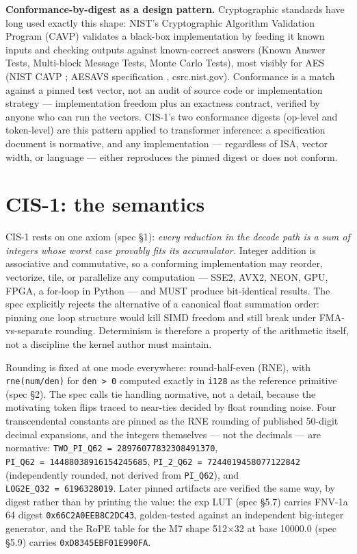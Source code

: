 \documentclass[11pt]{article}
\begin{document}
\textbf{Conformance-by-digest as a design pattern.} Cryptographic standards
have long used exactly this shape: NIST's Cryptographic Algorithm
Validation Program (CAVP) validates a black-box implementation by feeding
it known inputs and checking outputs against known-correct answers (Known
Answer Tests, Multi-block Message Tests, Monte Carlo Tests), most visibly
for AES (NIST CAVP \citep{nistcavp}; AESAVS specification \citep{nistaesavs}, csrc.nist.gov). Conformance is a
match against a pinned test vector, not an audit of source code or
implementation strategy --- implementation freedom plus an exactness
contract, verified by anyone who can run the vectors. CIS-1's two
conformance digests (op-level and token-level) are this pattern applied to
transformer inference: a specification document is normative, and any
implementation --- regardless of ISA, vector width, or language --- either
reproduces the pinned digest or does not conform.

\section{CIS-1: the semantics}\label{cis-1-the-semantics}

CIS-1 rests on one axiom (spec §1): \emph{every reduction in the decode path is a sum of integers whose
worst case provably fits its accumulator.} Integer addition is associative and commutative, so a
conforming implementation may reorder, vectorize, tile, or parallelize any computation --- SSE2,
AVX2, NEON, GPU, FPGA, a for-loop in Python --- and MUST produce bit-identical results. The spec
explicitly rejects the alternative of a canonical float summation order: pinning one loop
structure would kill SIMD freedom and still break under FMA-vs-separate rounding. Determinism is
therefore a property of the arithmetic itself, not a discipline the kernel author must maintain.

Rounding is fixed at one mode everywhere: round-half-even (RNE), with \texttt{rne(num/den)} for \texttt{den\ \textgreater{}\ 0}
computed exactly in \texttt{i128} as the reference primitive (spec §2). The spec calls tie handling normative,
not a detail, because the motivating token flips traced to near-ties decided by float rounding
noise. Four transcendental constants are pinned as the RNE rounding of published 50-digit decimal
expansions, and the integers themselves --- not the decimals --- are normative: \texttt{TWO\_PI\_Q62\ =\ 28976077832308491370}, \texttt{PI\_Q62\ =\ 14488038916154245685}, \texttt{PI\_2\_Q62\ =\ 7244019458077122842}
(independently rounded, not derived from \texttt{PI\_Q62}), and \texttt{LOG2E\_Q32\ =\ 6196328019}. Later pinned
artifacts are verified the same way, by digest rather than by printing the value: the exp LUT
(spec §5.7) carries FNV-1a 64 digest \texttt{0x66C2A0EEB8C2DC43}, golden-tested against an independent
big-integer generator, and the RoPE table for the M7 shape 512×32 at base 10000.0 (spec §5.9) carries
\texttt{0xD8345EBF01E990FA}.
\end{document}
